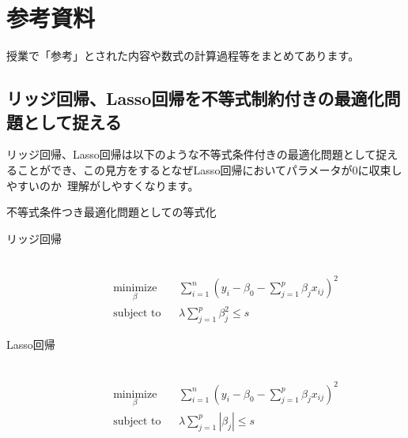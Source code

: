 \documentclass[uplatex]{jsarticle}
\begin{document}
\section{参考資料}
授業で「参考」とされた内容や数式の計算過程等をまとめてあります。
\subsection{リッジ回帰、Lasso回帰を不等式制約付きの最適化問題として捉える}
リッジ回帰、Lasso回帰は以下のような不等式条件付きの最適化問題として捉えることができ、この見方をするとなぜLasso回帰においてパラメータが0に収束しやすいのか\
理解がしやすくなります。

\begin{itembox}[l]{不等式条件つき最適化問題としての等式化}
  \begin{description}
    \item[リッジ回帰]\mbox{}\\
    \begin{equation*}
      \begin{aligned}
      & \underset{\beta}{\text{minimize}}
      & &\displaystyle{\sum_{i=1}^n \left(y_i - \beta_0 - \sum_{j=1}^p \beta_jx_{ij}\right)^2 }  \\
      & \text{subject to}
      & & \lambda \sum_{j=1}^p \beta_j^2 \leq s
      \end{aligned}
    \end{equation*}
    \item[Lasso回帰]\mbox{}\\
      \begin{equation*}
        \begin{aligned}
        & \underset{\beta}{\text{minimize}}
        & &\displaystyle{\sum_{i=1}^n \left(y_i - \beta_0 - \sum_{j=1}^p \beta_jx_{ij}\right)^2 }  \\
        & \text{subject to}
        & & \lambda \sum_{j=1}^p |\beta_j| \leq s
        \end{aligned}
      \end{equation*}
  \end{description}
\end{itembox}
\end{document}
